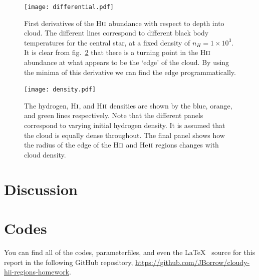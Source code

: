 \documentclass[a4paper]{article}
\begin{document}
\begin{figure}[!h]
\centering
\texttt{[image: differential.pdf]}
\caption{First derivatives of the H$\textsc{ii}$ abundance with
respect to depth into cloud. The different lines correspond to different
black body temperatures for the central star, at a fixed density of
$n_H = 1\times 10^3$. It is clear from fig.~\ref{fig:density} that
there is a turning point in the H$\textsc{ii}$ abundance at what
appears to be the `edge' of the cloud. By using the minima of this
derivative we can find the edge programmatically.}\label{fig:derivative}
\end{figure}

\begin{figure}
\centering
\texttt{[image: density.pdf]}
\caption{The hydrogen, H$\textsc{i}$, and H$\textsc{ii}$ densities
are shown by the blue, orange, and green lines respectively. Note that
the different panels correspond to varying initial hydrogen density. It
is assumed that the cloud is equally dense throughout. The final panel
shows how the radius of the edge of the H$\textsc{ii}$ and
He$\textsc{ii}$ regions changes with cloud
density.}\label{fig:density}
\end{figure}


\section{Discussion}

\section{Codes}

You can find all of the codes, parameterfiles, and even the \LaTeX~ source
for this report in the following GitHub repository,
\url{https://github.com/JBorrow/cloudy-hii-regions-homework}.


\end{document}
